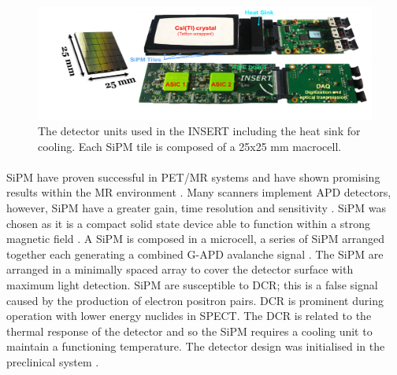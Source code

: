 \begin{figure}[!t]
\centering
\includegraphics[width=5in]{figures/detector.png}

    \caption{The detector units used in the \acrshort{INSERT} including the heat sink for cooling. Each \acrshort{SiPM} tile is composed of a 25x25 mm macrocell.} \label{fig:DetUnit}
\end{figure}

\paragraph{}
\acrshort{SiPM} have proven successful in \acrshort{PET/MR} systems and have shown promising results within the \acrshort{MR} environment \cite{MCELROY2007106}. Many scanners implement \acrshort{APD} detectors, however, \acrshort{SiPM} have a greater gain, time resolution and sensitivity \cite{RENKER200648} \cite{Wagatsuma2017ComparisonTOF-PET/CT}.  \acrshort{SiPM} was chosen as it is a compact solid state device able to function within a strong magnetic field \cite{SCHAART201631} \cite{0031-9155-56-23-014} \cite{DINU2015367}. A \acrshort{SiPM} is composed in a microcell, a series of \acrshort{SiPM} arranged together each generating a combined \acrshort{G-APD} avalanche signal \cite{DINU2015367}. The \acrshort{SiPM} are arranged in a minimally spaced array to cover the detector surface with maximum light detection. \acrshort{SiPM} are susceptible to \acrlong{DCR}; this is a false signal caused by the production of electron positron pairs. \acrshort{DCR} is prominent during operation with lower energy nuclides in \acrshort{SPECT}. The \acrshort{DCR} is related to the thermal response of the detector and so the \acrshort{SiPM} requires a cooling unit to maintain a functioning temperature. The detector design was initialised in the preclinical system \cite{7287793}.
